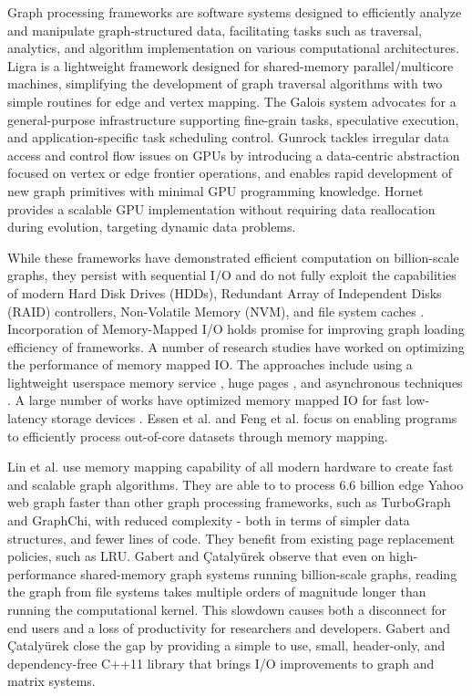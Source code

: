 Graph processing frameworks are software systems designed to efficiently analyze and manipulate graph-structured data, facilitating tasks such as traversal, analytics, and algorithm implementation on various computational architectures. Ligra \cite{shun2013ligra} is a lightweight framework designed for shared-memory parallel/multicore machines, simplifying the development of graph traversal algorithms with two simple routines for edge and vertex mapping. The Galois system \cite{nguyen2013lightweight} advocates for a general-purpose infrastructure supporting fine-grain tasks, speculative execution, and application-specific task scheduling control. Gunrock \cite{wang2016gunrock} tackles irregular data access and control flow issues on GPUs by introducing a data-centric abstraction focused on vertex or edge frontier operations, and enables rapid development of new graph primitives with minimal GPU programming knowledge. Hornet \cite{busato2018hornet} provides a scalable GPU implementation without requiring data reallocation during evolution, targeting dynamic data problems.

While these frameworks have demonstrated efficient computation on billion-scale graphs, they persist with sequential I/O and do not fully exploit the capabilities of modern Hard Disk Drives (HDDs), Redundant Array of Independent Disks (RAID) controllers, Non-Volatile Memory (NVM), and file system caches \cite{gabert2021pigo}. Incorporation of Memory-Mapped I/O holds promise for improving graph loading efficiency of frameworks. A number of research studies have worked on optimizing the performance of memory mapped IO. The approaches include using a lightweight userspace memory service \cite{li2019userland}, huge pages \cite{malliotakis2021hugemap}, and asynchronous techniques \cite{imamura2019poster}. A large number of works have optimized memory mapped IO for fast low-latency storage devices \cite{song2012low, song2016efficient, papagiannis2020optimizing, papagiannis2021memory, alverti2022daxvm, leis2023virtual}. Essen et al. \cite{van2015di} and Feng et al. \cite{feng2023tricache} focus on enabling programs to efficiently process out-of-core datasets through memory mapping.

Lin et al. \cite{lin2014mmap} use memory mapping capability of all modern hardware to create fast and scalable graph algorithms. They are able to to process 6.6 billion edge Yahoo web graph faster than other graph processing frameworks, such as TurboGraph and GraphChi, with reduced complexity - both in terms of simpler data structures, and fewer lines of code. They benefit from existing page replacement policies, such as LRU. Gabert and Çatalyürek \cite{gabert2021pigo} observe that even on high-performance shared-memory graph systems running billion-scale graphs, reading the graph from file systems takes multiple orders of magnitude longer than running the computational kernel. This slowdown causes both a disconnect for end users and a loss of productivity for researchers and developers. Gabert and Çatalyürek \cite{gabert2021pigo} close the gap by providing a simple to use, small, header-only, and dependency-free C++11 library that brings I/O improvements to graph and matrix systems.

